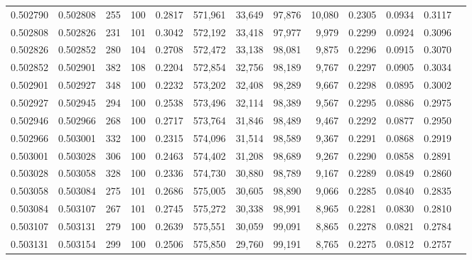 \begin{tabular}{rrrrrrrrrrrrr}
0.502790 & 0.502808 &   255 & 100 &                                     0.2817 & 571,961 &  33,649 &  97,876 &  10,080 & 0.2305 & 0.0934 & 0.3117 \\
0.502808 & 0.502826 &   231 & 101 &                                     0.3042 & 572,192 &  33,418 &  97,977 &   9,979 & 0.2299 & 0.0924 & 0.3096 \\
0.502826 & 0.502852 &   280 & 104 &                                     0.2708 & 572,472 &  33,138 &  98,081 &   9,875 & 0.2296 & 0.0915 & 0.3070 \\
0.502852 & 0.502901 &   382 & 108 &                                     0.2204 & 572,854 &  32,756 &  98,189 &   9,767 & 0.2297 & 0.0905 & 0.3034 \\
0.502901 & 0.502927 &   348 & 100 &                                     0.2232 & 573,202 &  32,408 &  98,289 &   9,667 & 0.2298 & 0.0895 & 0.3002 \\
0.502927 & 0.502945 &   294 & 100 &                                     0.2538 & 573,496 &  32,114 &  98,389 &   9,567 & 0.2295 & 0.0886 & 0.2975 \\
0.502946 & 0.502966 &   268 & 100 &                                     0.2717 & 573,764 &  31,846 &  98,489 &   9,467 & 0.2292 & 0.0877 & 0.2950 \\
0.502966 & 0.503001 &   332 & 100 &                                     0.2315 & 574,096 &  31,514 &  98,589 &   9,367 & 0.2291 & 0.0868 & 0.2919 \\
0.503001 & 0.503028 &   306 & 100 &                                     0.2463 & 574,402 &  31,208 &  98,689 &   9,267 & 0.2290 & 0.0858 & 0.2891 \\
0.503028 & 0.503058 &   328 & 100 &                                     0.2336 & 574,730 &  30,880 &  98,789 &   9,167 & 0.2289 & 0.0849 & 0.2860 \\
0.503058 & 0.503084 &   275 & 101 &                                     0.2686 & 575,005 &  30,605 &  98,890 &   9,066 & 0.2285 & 0.0840 & 0.2835 \\
0.503084 & 0.503107 &   267 & 101 &                                     0.2745 & 575,272 &  30,338 &  98,991 &   8,965 & 0.2281 & 0.0830 & 0.2810 \\
0.503107 & 0.503131 &   279 & 100 &                                     0.2639 & 575,551 &  30,059 &  99,091 &   8,865 & 0.2278 & 0.0821 & 0.2784 \\
0.503131 & 0.503154 &   299 & 100 &                                     0.2506 & 575,850 &  29,760 &  99,191 &   8,765 & 0.2275 & 0.0812 & 0.2757 \\

\end{tabular}
